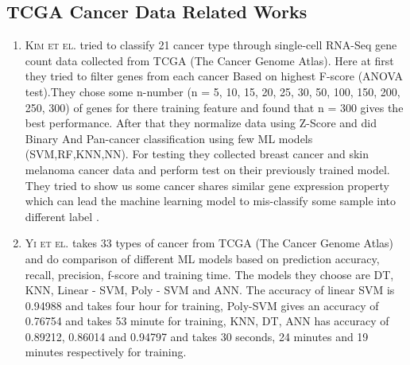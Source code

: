 \subsection{TCGA Cancer Data Related Works}
\begin{enumerate}
  \item \textsc{Kim et el.} tried to classify 21 cancer type through single-cell RNA-Seq gene count data collected from TCGA (The Cancer Genome Atlas). Here at first they tried to filter genes from each cancer Based on highest F-score (ANOVA test).They chose some n-number (n = 5, 10, 15, 20, 25, 30, 50, 100, 150, 200, 250, 300) of genes for there training feature and found that n = 300 gives the best performance. After that they normalize data using Z-Score and did Binary And Pan-cancer classification using few ML models (SVM,RF,KNN,NN). For testing they collected breast cancer and skin melanoma cancer data and perform test on their previously trained model. They tried to show us some cancer shares similar gene expression property which can lead the machine learning model to mis-classify some sample into different label \cite{10.1093/bioinformatics/btz772}.
  \item \textsc{Yi et el.} takes 33 types of cancer from TCGA (The Cancer Genome Atlas) and do comparison of different ML models based on prediction accuracy, recall, precision, f-score and training time. The models they choose are DT, KNN, Linear - SVM, Poly - SVM and ANN. The accuracy of linear SVM is 0.94988 and takes four hour for training, Poly-SVM gives an accuracy of 0.76754 and takes 53 minute for training, KNN,  DT, ANN has accuracy of 0.89212, 0.86014 and 0.94797 and takes 30 seconds, 24 minutes and 19 minutes respectively for training.   
  
  

\end{enumerate}
